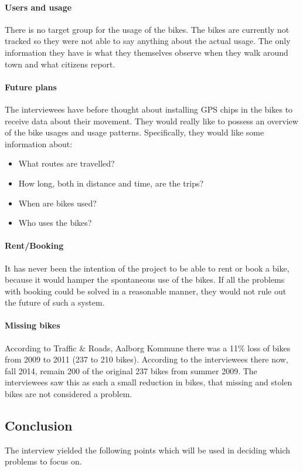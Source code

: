 \paragraph{Users and usage}
There is no target group for the usage of the bikes.
The bikes are currently not tracked so they were not able to say anything about the actual usage.
The only information they have is what they themselves observe when they walk around town and what citizens report.

\paragraph{Future plans}
The interviewees have before thought about installing GPS chips in the bikes to receive data about their movement.
They would really like to possess an overview of the bike usages and usage patterns.
Specifically, they would like some information about:
\begin{itemize}
\item What routes are travelled?
\item How long, both in distance and time, are the trips?
\item When are bikes used?
\item Who uses the bikes?
\end{itemize}

\paragraph{Rent/Booking}
It has never been the intention of the project to be able to rent or book a bike, because it would hamper the spontaneous use of the bikes.
If all the problems with booking could be solved in a reasonable manner, they would not rule out the future of such a system.

\paragraph{Missing bikes}
According to Traffic \& Roads, Aalborg Kommune\cite{cykelplanlaegning} there was a 11\% loss of bikes from 2009 to 2011 (237 to 210 bikes).
According to the interviewees there now, fall 2014, remain 200 of the original 237 bikes from summer 2009.
The interviewees saw this as such a small reduction in bikes, that missing and stolen bikes are not considered a problem.

\subsection{Conclusion}
The interview yielded the following points which will be used in deciding which problems to focus on.

